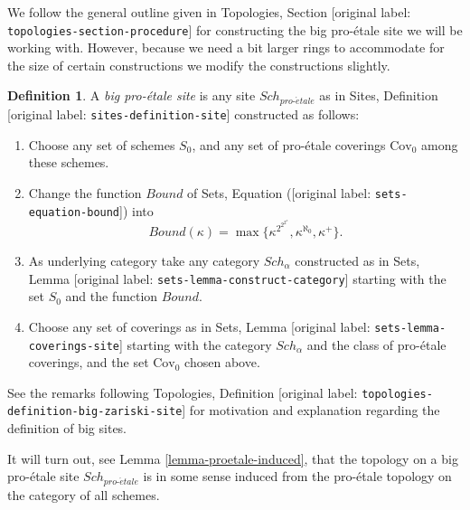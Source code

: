\documentclass[10pt,a4paper]{article}
\theoremstyle{plain}
\theoremstyle{definition}
\newtheorem{definition}[subsection]{Definition}
\theoremstyle{remark}
\numberwithin{equation}{subsection}
\def\Sch{\mathit{Sch}}
\def\proetale{{pro\text{-}\acute{e}tale}}
\begin{document}
\noindent
We follow the general outline given in
Topologies, Section \textnormal{[original label: \nolinkurl{topologies-section-procedure}]}
for constructing the big pro-\'etale site we will be working with.
However, because we need a bit larger rings to accommodate for the size
of certain constructions we modify the constructions slightly.

\begin{definition}
\label{definition-big-proetale-site}
A {\it big pro-\'etale site} is any site $\Sch_\proetale$ as in
Sites, Definition \textnormal{[original label: \nolinkurl{sites-definition-site}]} constructed as follows:
\begin{enumerate}
\item Choose any set of schemes $S_0$, and any set of pro-\'etale coverings
$\text{Cov}_0$ among these schemes.
\item Change the function $Bound$ of
Sets, Equation (\textnormal{[original label: \nolinkurl{sets-equation-bound}]}) into
$$
Bound(\kappa) = \max\{\kappa^{2^{2^{2^\kappa}}}, \kappa^{\aleph_0}, \kappa^+\}.
$$
\item As underlying category take any category $\Sch_\alpha$
constructed as in Sets, Lemma \textnormal{[original label: \nolinkurl{sets-lemma-construct-category}]}
starting with the set $S_0$ and the function $Bound$.
\item Choose any set of coverings as in
Sets, Lemma \textnormal{[original label: \nolinkurl{sets-lemma-coverings-site}]} starting with the
category $\Sch_\alpha$ and the class of pro-\'etale coverings,
and the set $\text{Cov}_0$ chosen above.
\end{enumerate}
\end{definition}

\noindent
See the remarks following
Topologies, Definition \textnormal{[original label: \nolinkurl{topologies-definition-big-zariski-site}]}
for motivation and explanation regarding the definition of big sites.

\medskip\noindent
It will turn out, see Lemma \ref{lemma-proetale-induced}, that the
topology on a big pro-\'etale site $\Sch_\proetale$ is in some sense
induced from the pro-\'etale topology on the category of all schemes.
\end{document}
